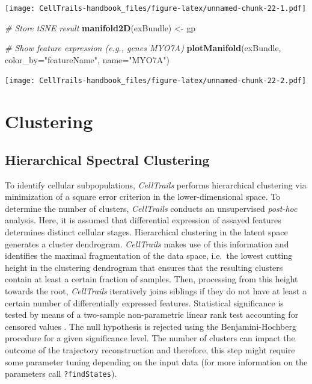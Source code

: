 \documentclass[]{book}
\newenvironment{Shaded}{\begin{snugshade}}{\end{snugshade}}
\newcommand{\KeywordTok}[1]{\textcolor[rgb]{0.13,0.29,0.53}{\textbf{#1}}}
\newcommand{\DataTypeTok}[1]{\textcolor[rgb]{0.13,0.29,0.53}{#1}}
\newcommand{\StringTok}[1]{\textcolor[rgb]{0.31,0.60,0.02}{#1}}
\newcommand{\CommentTok}[1]{\textcolor[rgb]{0.56,0.35,0.01}{\textit{#1}}}
\newcommand{\NormalTok}[1]{#1}
\theoremstyle{definition}
\theoremstyle{definition}
\theoremstyle{definition}
\theoremstyle{remark}
\begin{document}
\texttt{[image: CellTrails-handbook\_files/figure-latex/unnamed-chunk-22-1.pdf]}

\begin{Shaded}
\begin{Highlighting}[]
\CommentTok{# Store tSNE result}
\KeywordTok{manifold2D}\NormalTok{(exBundle) <-}\StringTok{ }\NormalTok{gp}

\CommentTok{# Show feature expression (e.g., genes MYO7A)}
\KeywordTok{plotManifold}\NormalTok{(exBundle, }\DataTypeTok{color_by=}\StringTok{"featureName"}\NormalTok{, }\DataTypeTok{name=}\StringTok{"MYO7A"}\NormalTok{)}
\end{Highlighting}
\end{Shaded}

\texttt{[image: CellTrails-handbook\_files/figure-latex/unnamed-chunk-22-2.pdf]}

\chapter{Clustering}\label{clustering}

\section{Hierarchical Spectral
Clustering}\label{hierarchical-spectral-clustering}

To identify cellular subpopulations, \emph{CellTrails} performs
hierarchical clustering via minimization of a square error criterion
\citep{ward1963} in the lower-dimensional space. To determine the number
of clusters, \emph{CellTrails} conducts an unsupervised \emph{post-hoc}
analysis. Here, it is assumed that differential expression of assayed
features determines distinct cellular stages. Hierarchical clustering in
the latent space generates a cluster dendrogram. \emph{CellTrails} makes
use of this information and identifies the maximal fragmentation of the
data space, i.e.~the lowest cutting height in the clustering dendrogram
that ensures that the resulting clusters contain at least a certain
fraction of samples. Then, processing from this height towards the root,
\emph{CellTrails} iteratively joins siblings if they do not have at
least a certain number of differentially expressed features. Statistical
significance is tested by means of a two-sample non-parametric linear
rank test accounting for censored values \citep{peto1972}. The null
hypothesis is rejected using the Benjamini-Hochberg
\citep{benjamini1995} procedure for a given significance level. The
number of clusters can impact the outcome of the trajectory
reconstruction and therefore, this step might require some parameter
tuning depending on the input data (for more information on the
parameters call \texttt{?findStates}).
\end{document}

